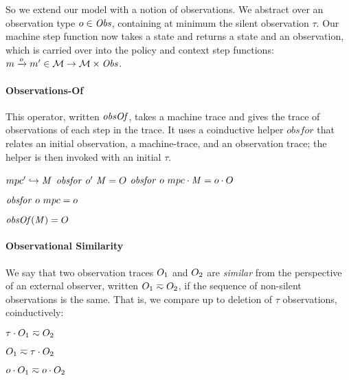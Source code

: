 \documentclass[acmsmall,review,anonymous]{acmart}\settopmatter{printfolios=true,printccs=false,printacmref=false}
\begin{document}
{{So we extend our model with a notion of observations. We abstract over an
observation type \(\obs \in \OBSS\), containing at minimum the silent observation
\(\tau\). Our machine step function now takes a state and returns a state and an observation,
which is carried over into the policy and context step functions:
%
$\mach \stepsto[\obs] \mach' \in \MACHS \rightarrow \MACHS \times \OBSS $.
%

\paragraph*{Observations-Of}

This operator, written \(\obsof\), takes a machine trace and
gives the trace of observations of each step in
the trace. It uses a coinductive helper \(\mathit{obsfor}\) that relates an
initial observation, a machine-trace, and an observation trace; the helper is
then invoked with an initial \(\tau\).

\begin{minipage}[b]{.55\textwidth}
                {\(\mpcstatename' \hookrightarrow \MPCT\)}
                {\(\mathit{obsfor} ~ \obs' ~ \MPCT = \obsT\)}
                {\(\mathit{obsfor} ~ \obs ~ \notfinished{\mpcstatename}{\MPCT} = \notfinished{\obs}{\obsT}\)}%
\end{minipage}
\begin{minipage}[b]{.22\textwidth}
  \judgment{}
           {\(\mathit{obsfor} ~ \obs ~ \mpcstatename = \obs\)}
\end{minipage}
\begin{minipage}[b]{.22\textwidth}
         {\(\obsof(\MPCT) = \obsT\)}
\end{minipage}

\paragraph*{Observational Similarity}

We say that two observation traces $\obsT_1$ and $\obsT_2$ are {\em similar}
from the perspective of an external observer, written \(\obsT_1 \eqsim
\obsT_2\), if the sequence of non-silent observations is the same. That is, we
compare up to deletion of \(\tau\) observations, coinductively:

\begin{minipage}{.2\textwidth}
  \judgment{}{\(\obsT \eqsim \obsT\)}
\end{minipage}
\begin{minipage}{.2\textwidth}
           {\(\notfinished{\tau}{\obsT_1} \eqsim \obsT_2\)}
\end{minipage}
\begin{minipage}{.2\textwidth}
           {\(\obsT_1 \eqsim \notfinished{\tau}{\obsT_2}\)}
\end{minipage}
\begin{minipage}{.2\textwidth}
           {\(\notfinished{\obs}{\obsT_1} \eqsim \notfinished{\obs}{\obsT_2}\)}
\end{minipage}


}}
\end{document}
